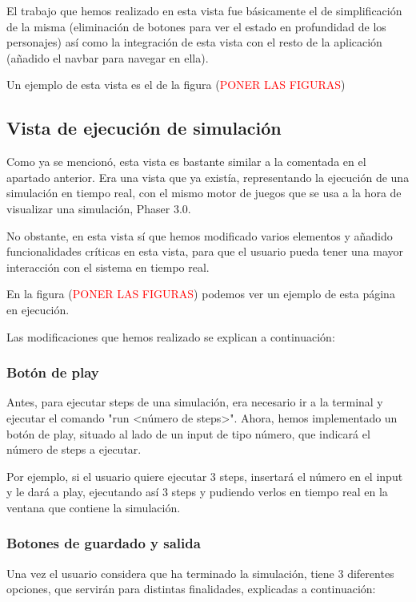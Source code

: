 El trabajo que hemos realizado en esta vista fue básicamente el de simplificación de la misma (eliminación de botones para ver el estado en profundidad de los personajes) así como la integración de esta vista con el resto de la aplicación (añadido el navbar para navegar en ella).

Un ejemplo de esta vista es el de la figura
(\textcolor{red}{PONER LAS FIGURAS})


\subsection{Vista de ejecución de simulación}

Como ya se mencionó, esta vista es bastante similar a la comentada en el apartado anterior. Era una vista que ya existía, representando la ejecución de una simulación en tiempo real, con el mismo motor de juegos que se usa a la hora de visualizar una simulación, Phaser 3.0.

No obstante, en esta vista sí que hemos modificado varios elementos y añadido funcionalidades críticas en esta vista, para que el usuario pueda tener una mayor interacción con el sistema en tiempo real.

En la figura (\textcolor{red}{PONER LAS FIGURAS}) podemos ver un ejemplo de esta página en ejecución.

Las modificaciones que hemos realizado se explican a continuación:

\subsubsection{Botón de play}

Antes, para ejecutar steps de una simulación, era necesario ir a la terminal y ejecutar el comando "run <número de steps>". Ahora, hemos implementado un botón de play, situado al lado de un input de tipo número, que indicará el número de steps a ejecutar. 

Por ejemplo, si el usuario quiere ejecutar 3 steps, insertará el número en el input y le dará a play, ejecutando así 3 steps y pudiendo verlos en tiempo real en la ventana que contiene la simulación.

\subsubsection{Botones de guardado y salida}

Una vez el usuario considera que ha terminado la simulación, tiene 3 diferentes opciones, que servirán para distintas finalidades, explicadas a continuación:

